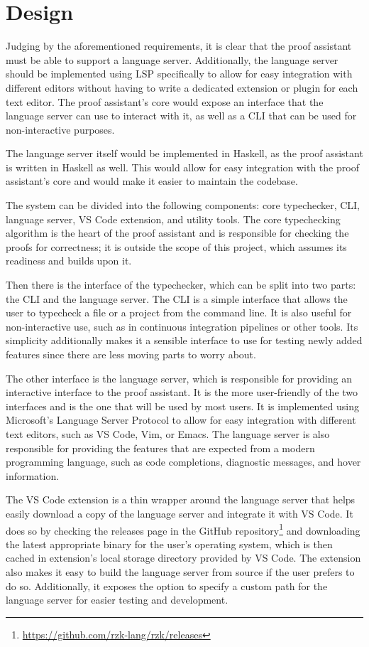 \section{Design}

Judging by the aforementioned requirements, it is clear that the proof assistant must be able to support a language server.
Additionally, the language server should be implemented using LSP specifically to allow for easy integration with
different editors without having to write a dedicated extension or plugin for each text editor.
The proof assistant's core would expose an interface that the language server can use to interact with it,
as well as a CLI that can be used for non-interactive purposes.

The language server itself would be implemented in Haskell, as the proof assistant is written in Haskell as well.
This would allow for easy integration with the proof assistant's core and would make it easier to maintain the codebase.

The system can be divided into the following components: core typechecker, CLI, language server, VS Code extension, and utility tools.
The core typechecking algorithm is the heart of the proof assistant and is responsible for checking the proofs for correctness;
it is outside the scope of this project, which assumes its readiness and builds upon it.

Then there is the interface of the typechecker, which can be split into two parts: the CLI and the language server.
The CLI is a simple interface that allows the user to typecheck a file or a project from the command line.
It is also useful for non-interactive use, such as in continuous integration pipelines or other tools.
Its simplicity additionally makes it a sensible interface to use for testing newly added features since
there are less moving parts to worry about.

The other interface is the language server, which is responsible for providing an interactive interface to the proof assistant.
It is the more user-friendly of the two interfaces and is the one that will be used by most users.
It is implemented using Microsoft's Language Server Protocol to allow for easy integration with different text editors,
such as VS Code, Vim, or Emacs.
The language server is also responsible for providing the features that are expected from a modern programming language,
such as code completions, diagnostic messages, and hover information.

The VS Code extension is a thin wrapper around the language server that helps easily download a copy of the language server
and integrate it with VS Code.
It does so by checking the releases page in the GitHub repository\footnote{\url{https://github.com/rzk-lang/rzk/releases}}
and downloading the latest appropriate binary for the user's operating system, which is then cached in extension's
local storage directory provided by VS Code.
The extension also makes it easy to build the language server from source if the user prefers to do so.
Additionally, it exposes the option to specify a custom path for the language server for easier testing and development.


